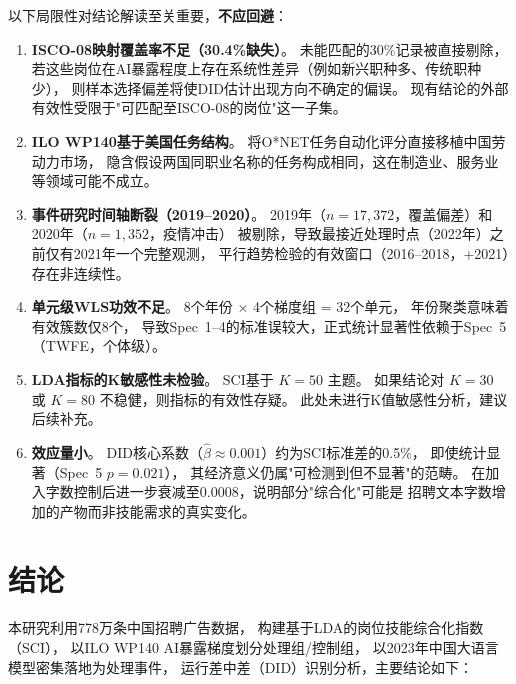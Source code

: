 \documentclass[12pt,a4paper]{ctexart}
\begin{document}
以下局限性对结论解读至关重要，\textbf{不应回避}：

\begin{enumerate}[label=\textbf{L\arabic*.}]
    \item \textbf{ISCO-08映射覆盖率不足（30.4\%缺失）}。
    未能匹配的30\%记录被直接剔除，
    若这些岗位在AI暴露程度上存在系统性差异（例如新兴职种多、传统职种少），
    则样本选择偏差将使DID估计出现方向不确定的偏误。
    现有结论的外部有效性受限于"可匹配至ISCO-08的岗位"这一子集。

    \item \textbf{ILO WP140基于美国任务结构}。
    将O*NET任务自动化评分直接移植中国劳动力市场，
    隐含假设两国同职业名称的任务构成相同，这在制造业、服务业等领域可能不成立。

    \item \textbf{事件研究时间轴断裂（2019--2020）}。
    2019年（$n=17{,}372$，覆盖偏差）和2020年（$n=1{,}352$，疫情冲击）
    被剔除，导致最接近处理时点（2022年）之前仅有2021年一个完整观测，
    平行趋势检验的有效窗口（2016--2018，+2021）存在非连续性。

    \item \textbf{单元级WLS功效不足}。
    8个年份 $\times$ 4个梯度组 = 32个单元，
    年份聚类意味着有效簇数仅8个，
    导致Spec~1--4的标准误较大，正式统计显著性依赖于Spec~5（TWFE，个体级）。

    \item \textbf{LDA指标的K敏感性未检验}。
    SCI基于 $K=50$ 主题。
    如果结论对 $K=30$ 或 $K=80$ 不稳健，则指标的有效性存疑。
    此处未进行K值敏感性分析，建议后续补充。

    \item \textbf{效应量小}。
    DID核心系数（$\hat{\beta} \approx 0.001$）约为SCI标准差的0.5\%，
    即使统计显著（Spec~5 $p = 0.021$），
    其经济意义仍属"可检测到但不显著"的范畴。
    在加入字数控制后进一步衰减至0.0008，说明部分"综合化"可能是
    招聘文本字数增加的产物而非技能需求的真实变化。
\end{enumerate}

\section{结论}

本研究利用778万条中国招聘广告数据，
构建基于LDA的岗位技能综合化指数（SCI），
以ILO WP140 AI暴露梯度划分处理组/控制组，
以2023年中国大语言模型密集落地为处理事件，
运行差中差（DID）识别分析，主要结论如下：
\end{document}
